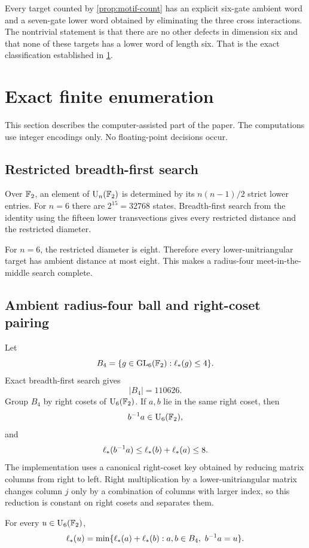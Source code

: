 Every target counted by \cref{prop:motif-count} has an explicit six-gate ambient word and a seven-gate lower word obtained by eliminating the three cross interactions.  The nontrivial statement is that there are no other defects in dimension six and that none of these targets has a lower word of length six.  That is the exact classification established in \cref{sec:enumeration}.

\section{Exact finite enumeration}\label{sec:enumeration}

This section describes the computer-assisted part of the paper.  The computations use integer encodings only.  No floating-point decisions occur.

\subsection{Restricted breadth-first search}

Over $\mathbb F_2$, an element of $\operatorname{U}_n(\mathbb F_2)$ is determined by its $n(n-1)/2$ strict lower entries.  For $n=6$ there are $2^{15}=32768$ states.  Breadth-first search from the identity using the fifteen lower transvections gives every restricted distance and the restricted diameter.

For $n=6$, the restricted diameter is eight.  Therefore every lower-unitriangular target has ambient distance at most eight.  This makes a radius-four meet-in-the-middle search complete.

\subsection{Ambient radius-four ball and right-coset pairing}

Let
\[
B_4=\{g\in\operatorname{GL}_6(\mathbb F_2):\ell_{*}(g)\le4\}.
\]
Exact breadth-first search gives
\[
|B_4|=110626.
\]
Group $B_4$ by right cosets of $\operatorname{U}_6(\mathbb F_2)$.  If $a,b$ lie in the same right coset, then
\[
b^{-1}a\in\operatorname{U}_6(\mathbb F_2),
\]
and
\[
\ell_{*}(b^{-1}a)\le\ell_{*}(b)+\ell_{*}(a)\le8.
\]
The implementation uses a canonical right-coset key obtained by reducing matrix columns from right to left.  Right multiplication by a lower-unitriangular matrix changes column $j$ only by a combination of columns with larger index, so this reduction is constant on right cosets and separates them.

\begin{lemma}\label{lem:mitm-complete}
For every $u\in\operatorname{U}_6(\mathbb F_2)$,
\[
\ell_{*}(u)
=
\min\{\ell_{*}(a)+\ell_{*}(b):a,b\in B_4,\ b^{-1}a=u\}.
\]
\end{lemma}

